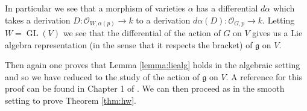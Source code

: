 \documentclass[manuscript, printscheme]{aomart}
\theoremstyle{plain} %
\theoremstyle{definition}
\theoremstyle{remark}
\newcommand{\cO}{{\mathcal{O}}}
\DeclareMathOperator{\GL}{GL}
\newcommand{\mf}[1]{\mathfrak{#1}}
\begin{document}
\hfill

In particular we see that a morphism of varieties $\alpha$ has a differential $d\alpha$ which takes
a derivation $D:\cO_{W,\alpha(p)}\to k$ to a derivation $d\alpha(D):\cO_{G,p}\to k$. Letting $W = \GL(V)$
we see that the differential of the action of $G$ on $V$ gives us a Lie algebra representation (in the sense that
it respects the bracket) of $\mf g$ on $V$.

\hfill

Then again one proves that Lemma \ref{lemma:liealg} holds in the algebraic setting and
so we have reduced to the study of the action of $\mf g$ on $V$. A reference for this
proof can be found in Chapter 1 of \cite{borel}.
We can then proceed as in the smooth setting to prove Theorem \ref{thm:hw}.


{}

\end{document}
